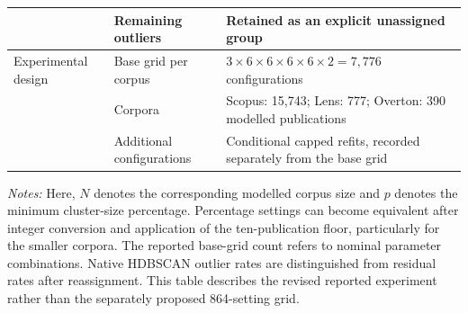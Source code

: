 \documentclass[a4paper,fleqn]{cas-sc}
\begin{document}
\begin{table}[htbp]
\begin{tabularx}{\textwidth}{p{27mm}p{38mm}X}
    & Remaining outliers & Retained as an explicit unassigned group \\
    \midrule
    Experimental design & Base grid per corpus & $3\times6\times6\times6\times6\times2=7{,}776$ configurations \\
    & Corpora & Scopus: 15,743; Lens: 777; Overton: 390 modelled publications \\
    & Additional configurations & Conditional capped refits, recorded separately from the base grid \\
    \bottomrule
    \end{tabularx}
    \vspace{2mm}
    \begin{minipage}{\textwidth}
    \footnotesize
    \textit{Notes:} Here, $N$ denotes the corresponding modelled corpus size and $p$ denotes the minimum cluster-size percentage. Percentage settings can become equivalent after integer conversion and application of the ten-publication floor, particularly for the smaller corpora. The reported base-grid count refers to nominal parameter combinations. Native HDBSCAN outlier rates are distinguished from residual rates after reassignment. This table describes the revised reported experiment rather than the separately proposed 864-setting grid.
    \end{minipage}
    \end{table}
    
\end{document}

